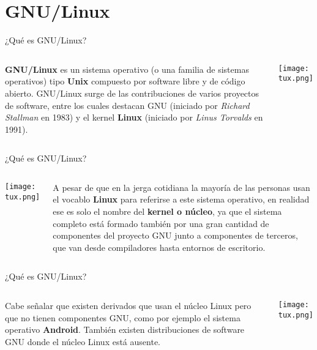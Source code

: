 
\section{GNU/Linux}

\begin{frame}[c]{¿Qué es GNU/Linux?}
    \begin{columns}
        \textbf{GNU/Linux} es un sistema operativo (o una familia de sistemas
        operativos) tipo \textbf{Unix} compuesto por software libre y de código
        abierto. GNU/Linux surge de las contribuciones de varios proyectos
        de software, entre los cuales destacan GNU (iniciado por \emph{Richard
        Stallman} en 1983) y el kernel \textbf{Linux} (iniciado
        por \emph{Linus Torvalds} en 1991).
        \begin{center}
            \texttt{[image: tux.png]}
        \end{center}
    \end{columns}
\end{frame}

\begin{frame}[c]{¿Qué es GNU/Linux?}
    \begin{columns}
        \begin{center}
            \texttt{[image: tux.png]}
        \end{center}
        A pesar de que en la jerga cotidiana la mayoría de las personas usan
        el vocablo \textbf{Linux} para referirse a este sistema operativo, en
        realidad ese es solo el nombre del \textbf{kernel o núcleo}, ya que
        el sistema completo está formado también por una gran cantidad de
        componentes del proyecto GNU junto a componentes de terceros, que
        van desde compiladores hasta entornos de escritorio.
    \end{columns}
\end{frame}

\begin{frame}[c]{¿Qué es GNU/Linux?}
    \begin{columns}
        Cabe señalar que existen derivados que usan el núcleo Linux pero que
        no tienen componentes GNU, como por ejemplo el sistema operativo
        \textbf{Android}. También existen distribuciones de software GNU
        donde el núcleo Linux está ausente.
        \begin{center}
            \texttt{[image: tux.png]}
        \end{center}
    \end{columns}
\end{frame}
